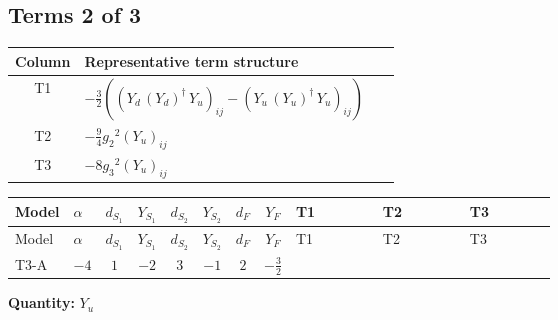\documentclass[8pt]{article}
\begin{document}
\begin{landscape}
\subsection*{Terms 2 of 3}
\begin{center}
\begin{tabular}{@{}c >{\raggedright\arraybackslash}p{0.82\linewidth}@{}}
\toprule
Column & Representative term structure \\
\midrule
T1 & \(\displaystyle -\frac{3}{2} (\left({Y_d}\,\left({Y_d}\right)^{\dagger}\,{Y_u}\right)_{ij}-\left({Y_u}\,\left({Y_u}\right)^{\dagger}\,{Y_u}\right)_{ij})\) \\
\midrule
T2 & \(\displaystyle -\frac{9}{4} {g_2}^2 \left({Y_u}\right)_{ij}\) \\
\midrule
T3 & \(\displaystyle -8 {g_3}^2 \left({Y_u}\right)_{ij}\) \\
\midrule
\bottomrule
\end{tabular}
\end{center}
\smallskip
\tiny
\begin{longtable}{@{}llcccccc >{\raggedright\arraybackslash}p{0.21\linewidth} >{\raggedright\arraybackslash}p{0.21\linewidth} >{\raggedright\arraybackslash}p{0.21\linewidth}@{}}
\toprule
Model & $\alpha$ & $d_{S_1}$ & $Y_{S_1}$ & $d_{S_2}$ & $Y_{S_2}$ & $d_F$ & $Y_F$ & T1 & T2 & T3 \\
\midrule
\endfirsthead
\toprule
Model & $\alpha$ & $d_{S_1}$ & $Y_{S_1}$ & $d_{S_2}$ & $Y_{S_2}$ & $d_F$ & $Y_F$ & T1 & T2 & T3 \\
\midrule
\endhead
T3-A & $-4$ & $1$ & $-2$ & $3$ & $-1$ & $2$ & $-\frac{3}{2}$ & \scriptsize\adjustbox{max width=\linewidth}{$\begin{gathered} -\frac{3}{2} (\left({Y_d}\,\left({Y_d}\right)^{\dagger}\,{Y_u}\right)_{ij}-\left({Y_u}\,\left({Y_u}\right)^{\dagger}\,{Y_u}\right)_{ij})\end{gathered}$} & \scriptsize\adjustbox{max width=\linewidth}{$\begin{gathered} -\frac{9}{4} {g_2}^2 \left({Y_u}\right)_{ij}\end{gathered}$} & \scriptsize\adjustbox{max width=\linewidth}{$\begin{gathered} -8 {g_3}^2 \left({Y_u}\right)_{ij}\end{gathered}$} \\
\midrule
\bottomrule
\end{longtable}
\clearpage
\noindent\textbf{Quantity: }$Y_u$\par\smallskip

\end{landscape}
\end{document}
